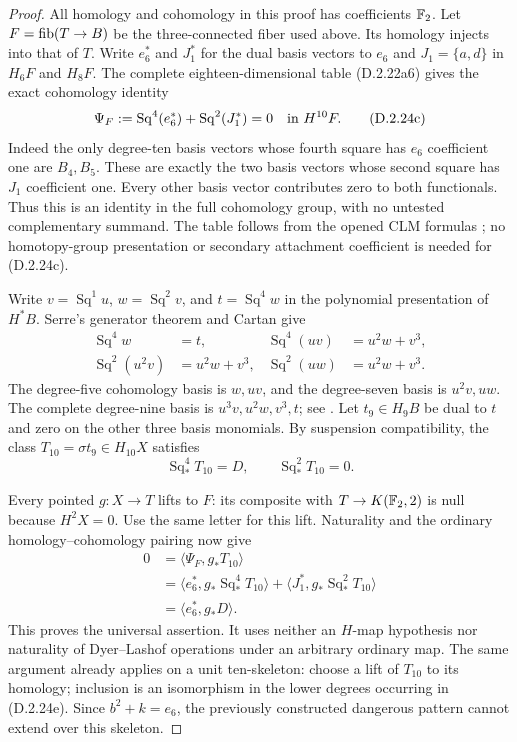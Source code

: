 \begin{proof}
All homology and cohomology in this proof has coefficients
$\mathbb F_2$. Let $F=\operatorname{fib}(T\to B)$ be the three-connected fiber
used above. Its homology injects into that of $T$.
Write $e_6^*$ and $J_1^*$ for the dual basis vectors to
$e_6$ and $J_1=\{a,d\}$ in $H_6F$ and $H_8F$.
The complete eighteen-dimensional table
\textup{(D.2.22a6)} gives the exact cohomology identity
\[
 \Psi_F:=\operatorname{Sq}^4(e_6^*)+
                   \operatorname{Sq}^2(J_1^*)=0
                   \quad\hbox{in }H^{10}F.
 \tag{D.2.24c}
\]
Indeed the only degree-ten basis vectors whose fourth square
has $e_6$ coefficient one are $B_4,B_5$. These are exactly
the two basis vectors whose second square has $J_1$
coefficient one. Every other basis vector contributes zero
to both functionals. Thus this is an identity in the full
cohomology group, with no untested complementary summand.
The table follows from the opened CLM formulas
\cite[Chapter III, Theorems 1.2--1.4]{I_CohenLadaMay1976};
no homotopy-group presentation or secondary attachment
coefficient is needed for \textup{(D.2.24c)}.

Write $v=\operatorname{Sq}^1u$, $w=\operatorname{Sq}^2v$,
and $t=\operatorname{Sq}^4w$ in the polynomial presentation
of $H^*B$. Serre's generator theorem and Cartan give
\[
\begin{aligned}
 \operatorname{Sq}^4w&=t,&
 \operatorname{Sq}^4(uv)&=u^2w+v^3,\\
 \operatorname{Sq}^2(u^2v)&=u^2w+v^3,&
 \operatorname{Sq}^2(uw)&=u^2w+v^3.
\end{aligned}
 \tag{D.2.24d}
\]
The degree-five cohomology basis is $w,uv$, and the
degree-seven basis is $u^2v,uw$. The complete degree-nine
basis is $u^3v,u^2w,v^3,t$; see
\cite[\S2, nos.8--9]{I_Serre1953}.
Let $t_9\in H_9B$ be dual to $t$ and zero on the other
three basis monomials. By suspension compatibility,
the class $T_{10}=\sigma t_9\in H_{10}X$ satisfies
\[
 \operatorname{Sq}_*^4T_{10}=D,
 \qquad \operatorname{Sq}_*^2T_{10}=0.
 \tag{D.2.24e}
\]

Every pointed $g:X\to T$ lifts to $F$: its composite
with $T\to K(\mathbb F_2,2)$ is null because $H^2X=0$.
Use the same letter for this lift. Naturality and the
ordinary homology--cohomology pairing now give
\[
\begin{split}
 0
 &=\langle\Psi_F,g_*T_{10}\rangle\\
 &=\langle e_6^*,g_*\operatorname{Sq}_*^4T_{10}\rangle
   +\langle J_1^*,g_*\operatorname{Sq}_*^2T_{10}\rangle\\
 &=\langle e_6^*,g_*D\rangle.
\end{split}
 \tag{D.2.24f}
\]
This proves the universal assertion. It uses neither an
$H$-map hypothesis nor naturality of Dyer--Lashof operations
under an arbitrary ordinary map. The same argument already
applies on a unit ten-skeleton: choose a lift of $T_{10}$
to its homology; inclusion is an isomorphism in the lower
degrees occurring in \textup{(D.2.24e)}. Since
$b^2+k=e_6$, the previously constructed dangerous pattern
cannot extend over this skeleton.


\end{proof}
